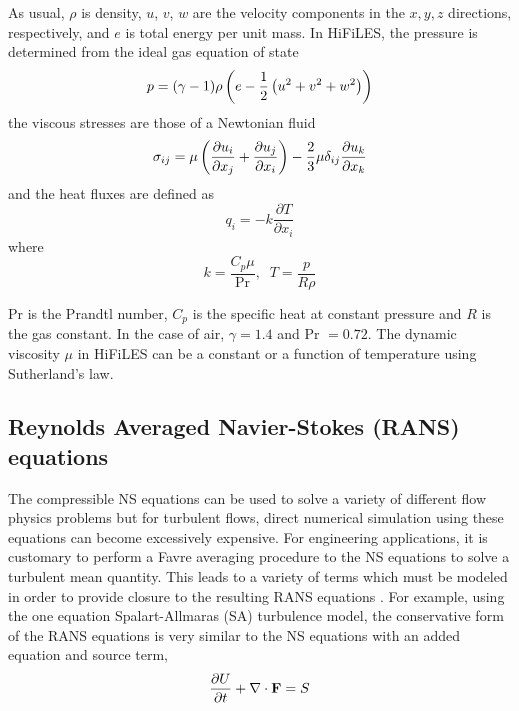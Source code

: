 As usual, $\rho$ is density, $u$, $v$, $w$ are the velocity components in the $x, y, z$ directions, respectively, and $e$ is total energy per unit mass. In HiFiLES, the pressure is determined from the ideal gas equation of state
\begin{equation}
p = (\gamma - 1)\rho\left(e - \frac{1}{2}\left(u^2 + v^2 + w^2\right)\right)
\end{equation}
the viscous stresses are those of a Newtonian fluid
\begin{equation}\label{sigma}
\sigma_{ij} = \mu\left( \frac{\partial u_i}{\partial x_j}
+ \frac{\partial u_j}{\partial x_i} \right)
- \frac{2}{3}\mu \delta_{ij}\frac{\partial u_k}{\partial x_k}
\end{equation}
and the heat fluxes are defined as
\begin{equation}
q_i = -k \frac{\partial T}{\partial x_i}
\end{equation}
where
\begin{equation}
k = \frac{C_p \mu}{\text{Pr}} , \;\; T = \frac{p}{R \rho}
\end{equation}

Pr is the Prandtl number, $C_p$ is the specific heat at constant pressure and $R$ is the gas constant. In the case of air, $\gamma = 1.4$ and Pr $= 0.72$. The dynamic viscosity $\mu$ in HiFiLES can be a constant or a function of temperature using Sutherland's law.


\subsection{Reynolds Averaged Navier-Stokes (RANS) equations}
The compressible NS equations can be used to solve a variety of different flow physics problems but for turbulent flows, direct numerical simulation using these equations can become excessively expensive. For engineering applications, it is customary to perform a Favre averaging procedure to the NS equations to solve a turbulent mean quantity. This leads to a variety of terms which must be modeled in order to provide closure to the resulting RANS equations \cite{wilcox1998turbulence,oliver2008high}. For example, using the one equation Spalart-Allmaras (SA) turbulence model, the conservative form of the RANS equations is very similar to the NS equations with an added equation and source term,
\begin{align}
	\frac{\partial U}{\partial t} +  \nabla \cdot {\bf F} = S
\end{align}

